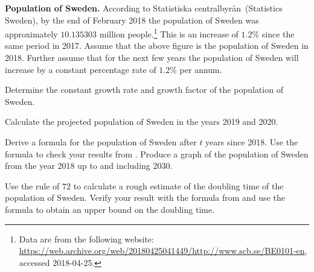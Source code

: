 \documentclass[a4paper,oneside,12pt]{article}
\begin{document}
\begin{exercise}
\textbf{Population of Sweden.}
According to Statistiska centralbyr{\aa}n~(Statistics Sweden), by the
end of February 2018 the population of Sweden was approximately
$10.135303$ million people.\footnote{
  Data are from the following website:
  \url{https://web.archive.org/web/20180425041449/http://www.scb.se/BE0101-en},
  accessed 2018-04-25.
}
This is an increase of $1.2\%$ since the same period in 2017.  Assume
that the above figure is the population of Sweden in 2018.  Further
assume that for the next few years the population of Sweden will
increase by a constant percentage rate of $1.2\%$ per annum.
\begin{packedenum}
\item\label{subex:exponential:Sweden_population_growth_rate_factor}
  Determine the constant growth rate and growth factor of the
  population of Sweden.

\item\label{subex:exponential:Sweden_population_2019_2020}
  Calculate the projected population of Sweden in the years 2019 and
  2020.

\item\label{subex:exponential:Sweden_population_formula_graph}
  Derive a formula for the population of Sweden after $t$ years since
  2018.  Use the formula to check your results
  from .  Produce
  a graph of the population of Sweden from the year 2018 up to and
  including 2030.

\item\label{subex:exponential:Sweden_population_doubling_time}
  Use the rule of $72$ to calculate a rough estimate of the doubling
  time of the population of Sweden.  Verify your result with the
  formula
  from  and
  use the formula to obtain an upper bound on the doubling time.
\end{packedenum}
\end{exercise}
\end{document}
